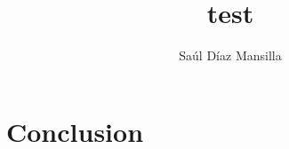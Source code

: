 \documentclass{article}
\title{test}
\author{Saúl Díaz Mansilla}
\begin{document}
\maketitle

\section{Conclusion}

\nocite{*}



\end{document}

